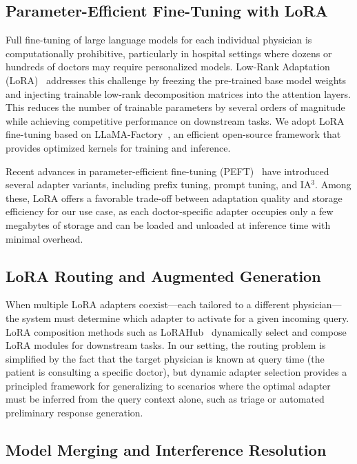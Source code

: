 \subsection*{Parameter-Efficient Fine-Tuning with LoRA}

Full fine-tuning of large language models for each individual physician is computationally prohibitive, particularly in hospital settings where dozens or hundreds of doctors may require personalized models. Low-Rank Adaptation (LoRA)~\cite{hu2021lora} addresses this challenge by freezing the pre-trained base model weights and injecting trainable low-rank decomposition matrices into the attention layers. This reduces the number of trainable parameters by several orders of magnitude while achieving competitive performance on downstream tasks. We adopt LoRA fine-tuning based on LLaMA-Factory~\cite{zheng2024llamafactory}, an efficient open-source framework that provides optimized kernels for training and inference.

Recent advances in parameter-efficient fine-tuning (PEFT)~\cite{peft} have introduced several adapter variants, including prefix tuning, prompt tuning, and IA$^3$. Among these, LoRA offers a favorable trade-off between adaptation quality and storage efficiency for our use case, as each doctor-specific adapter occupies only a few megabytes of storage and can be loaded and unloaded at inference time with minimal overhead.

\subsection*{LoRA Routing and Augmented Generation}

When multiple LoRA adapters coexist---each tailored to a different physician---the system must determine which adapter to activate for a given incoming query. LoRA composition methods such as LoRAHub~\cite{huangLoraHubEfficientCrossTask2024} dynamically select and compose LoRA modules for downstream tasks. In our setting, the routing problem is simplified by the fact that the target physician is known at query time (the patient is consulting a specific doctor), but dynamic adapter selection provides a principled framework for generalizing to scenarios where the optimal adapter must be inferred from the query context alone, such as triage or automated preliminary response generation.

\subsection*{Model Merging and Interference Resolution}

